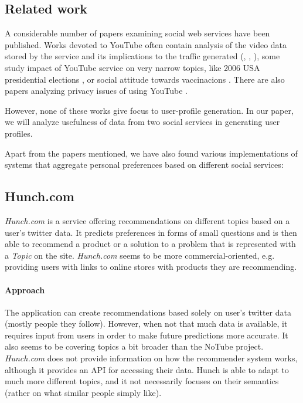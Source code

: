 \subsection{Related work}

A considerable number of papers examining social web services have been
published. Works devoted to YouTube often contain analysis of the video data
stored by the service and its implications to the traffic generated
(\cite{i-tube-you-tube}, \cite{views-from-the-edge},
\cite{statistics-and-social-network}), some study impact of YouTube service on
very narrow topics, like 2006 USA presidential elections
\cite{voters-myspace-youtube}, or social attitude towards vaccinacions
\cite{keelan}. There are also papers analyzing privacy issues of using YouTube
\cite{publicly-private}.

However, none of these works give focus to user-profile generation. In our
paper, we will analyze usefulness of data from two social services in generating
user profiles.

Apart from the papers mentioned, we have also found various implementations of systems that aggregate personal preferences based on different
social services:

\subsection{Hunch.com}
\textit{Hunch.com} is a service offering recommendations on different topics based on a user's twitter data. It predicts preferences in forms of small questions and is then able to recommend a product or a solution to a problem that is represented with a \textit{Topic} on the site. \textit{Hunch.com} seems to be more commercial-oriented, e.g. providing users with links to online stores with products they are recommending.

\paragraph{Approach}
The application can create recommendations based solely on user's twitter data (mostly people they follow). However, when not that much data is available, it requires input from users in order to make future predictions more accurate. It also seems to be covering topics a bit broader than the NoTube project.
\textit{Hunch.com} does not provide information on how the recommender system works, although it provides an API for accessing their data.
Hunch is able to adapt to much more different topics, and it not necessarily focuses on their semantics (rather on what similar people simply like).

